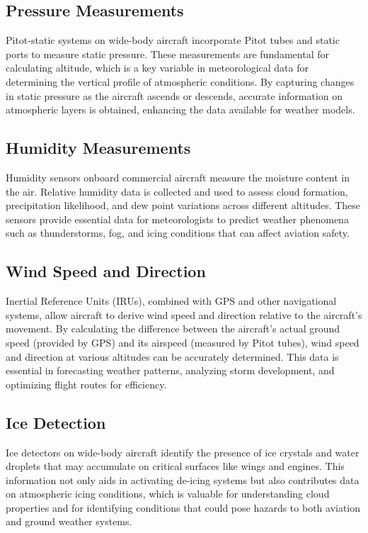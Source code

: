 \documentclass[a4paper, 12pt]{report}
\begin{document}
\subsection{Pressure Measurements}
Pitot-static systems on wide-body aircraft incorporate Pitot tubes and static ports to measure static pressure. These measurements are fundamental for calculating altitude, which is a key variable in meteorological data for determining the vertical profile of atmospheric conditions. By capturing changes in static pressure as the aircraft ascends or descends, accurate information on atmospheric layers is obtained, enhancing the data available for weather models.

\subsection{Humidity Measurements}
Humidity sensors onboard commercial aircraft measure the moisture content in the air. Relative humidity data is collected and used to assess cloud formation, precipitation likelihood, and dew point variations across different altitudes. These sensors provide essential data for meteorologists to predict weather phenomena such as thunderstorms, fog, and icing conditions that can affect aviation safety.

\subsection{Wind Speed and Direction}
Inertial Reference Units (IRUs), combined with GPS and other navigational systems, allow aircraft to derive wind speed and direction relative to the aircraft’s movement. By calculating the difference between the aircraft’s actual ground speed (provided by GPS) and its airspeed (measured by Pitot tubes), wind speed and direction at various altitudes can be accurately determined. This data is essential in forecasting weather patterns, analyzing storm development, and optimizing flight routes for efficiency.

\subsection{Ice Detection}
Ice detectors on wide-body aircraft identify the presence of ice crystals and water droplets that may accumulate on critical surfaces like wings and engines. This information not only aids in activating de-icing systems but also contributes data on atmospheric icing conditions, which is valuable for understanding cloud properties and for identifying conditions that could pose hazards to both aviation and ground weather systems.
\end{document}
